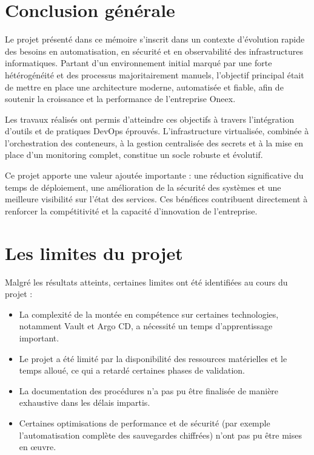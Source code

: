 \section{Conclusion générale}

Le projet présenté dans ce mémoire s’inscrit dans un contexte d’évolution rapide des besoins en automatisation, en sécurité et en observabilité des infrastructures informatiques. Partant d’un environnement initial marqué par une forte hétérogénéité et des processus majoritairement manuels, l’objectif principal était de mettre en place une architecture moderne, automatisée et fiable, afin de soutenir la croissance et la performance de l’entreprise Oneex.

Les travaux réalisés ont permis d’atteindre ces objectifs à travers l’intégration d’outils et de pratiques DevOps éprouvés. L’infrastructure virtualisée, combinée à l’orchestration des conteneurs, à la gestion centralisée des secrets et à la mise en place d’un monitoring complet, constitue un socle robuste et évolutif. 

Ce projet apporte une valeur ajoutée importante : une réduction significative du temps de déploiement, une amélioration de la sécurité des systèmes et une meilleure visibilité sur l’état des services. Ces bénéfices contribuent directement à renforcer la compétitivité et la capacité d’innovation de l’entreprise.

\section{Les limites du projet}

Malgré les résultats atteints, certaines limites ont été identifiées au cours du projet :

\begin{itemize}
    \item La complexité de la montée en compétence sur certaines technologies, notamment Vault et Argo CD, a nécessité un temps d’apprentissage important.
    \item Le projet a été limité par la disponibilité des ressources matérielles et le temps alloué, ce qui a retardé certaines phases de validation.
    \item La documentation des procédures n’a pas pu être finalisée de manière exhaustive dans les délais impartis.
    \item Certaines optimisations de performance et de sécurité (par exemple l’automatisation complète des sauvegardes chiffrées) n’ont pas pu être mises en œuvre.
\end{itemize}

